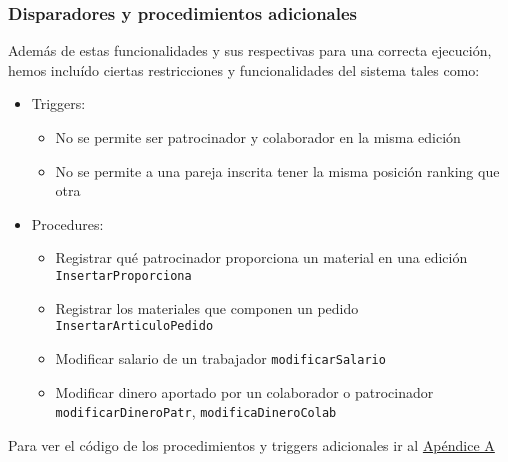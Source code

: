 \subsubsection{Disparadores y procedimientos adicionales}
Además de estas funcionalidades y sus respectivas para una correcta ejecución,
hemos incluído ciertas restricciones y funcionalidades del sistema tales como:
\begin{itemize}
	\item Triggers:
	\begin{itemize}
		\item No se permite ser patrocinador y colaborador en la misma edición
		\item No se permite a una pareja inscrita tener la misma posición ranking que otra
	\end{itemize}
	\item Procedures:
	\begin{itemize}
		\item Registrar qué patrocinador proporciona un material en una edición \texttt{InsertarProporciona}
		\item Registrar los materiales que componen un pedido \texttt{InsertarArticuloPedido}
		\item Modificar salario de un trabajador \texttt{modificarSalario}
		\item Modificar dinero aportado por un colaborador o patrocinador \texttt{modificarDineroPatr}, \texttt{modificaDineroColab}
	\end{itemize}
\end{itemize}

Para ver el código de los procedimientos y triggers adicionales ir al \hyperref[cap:extras]{Apéndice A}
